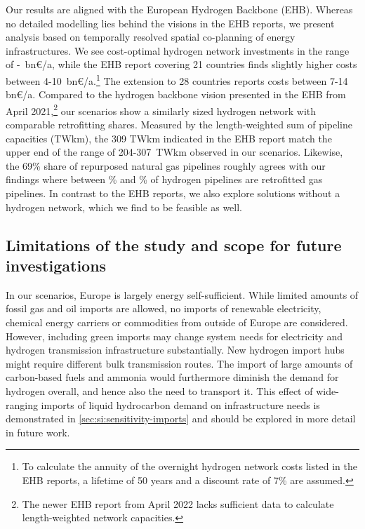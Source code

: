 Our results are aligned with the European Hydrogen Backbone
(EHB).\cite{gasforclimateEuropeanHydrogen2020,gasforclimateExtendingEuropean2021,gasforclimateEuropeanHydrogen2021,gasforclimateEuropeanHydrogen2022}
Whereas no detailed modelling lies behind the visions in the EHB reports, we
present analysis based on temporally resolved spatial co-planning of energy
infrastructures. We see cost-optimal hydrogen network investments in the range
of \minhycost-\maxhycost~bn\euro/a, while the EHB report covering 21 countries
finds slightly higher costs between
4-10~bn\euro/a.\cite{gasforclimateExtendingEuropean2021}\footnote{To calculate
the annuity of the overnight hydrogen network costs listed in the EHB reports, a
lifetime of 50 years and a discount rate of 7\% are assumed.} The extension to
28 countries reports costs between 7-14
bn\euro/a.\cite{gasforclimateEuropeanHydrogen2022} Compared to the hydrogen
backbone vision presented in the EHB from April
2021,\cite{gasforclimateExtendingEuropean2021}\footnote{The newer EHB report
from April 2022 \cite{gasforclimateEuropeanHydrogen2022} lacks sufficient data
to calculate length-weighted network capacities.} our scenarios show a
similarly sized hydrogen network with comparable retrofitting shares. Measured
by the length-weighted sum of pipeline capacities (TWkm), the 309 TWkm indicated
in the EHB report match the upper end of the range of 204-307~TWkm observed in
our scenarios. Likewise, the 69\% share of repurposed natural gas pipelines
\cite{gasforclimateExtendingEuropean2021} roughly agrees with our findings where
between \minretroshare\% and \maxretroshare\% of hydrogen pipelines are
retrofitted gas pipelines. In contrast to the EHB reports, we also explore
solutions without a hydrogen network, which we find to be feasible as well.

\subsection*{Limitations of the study and scope for future investigations}
\label{sec:limitations}

In our scenarios, Europe is largely energy self-sufficient. While limited
amounts of fossil gas and oil imports are allowed, no imports of renewable
electricity, chemical energy carriers or commodities from outside of Europe are
considered. However, including green imports may change system needs for
electricity and hydrogen transmission infrastructure substantially. New hydrogen
import hubs might require different bulk transmission routes. The import of
large amounts of carbon-based fuels and ammonia would furthermore diminish the
demand for hydrogen overall, and hence also the need to transport it. This
effect of wide-ranging imports of liquid hydrocarbon demand on infrastructure
needs is demonstrated in \cref{sec:si:sensitivity-imports} and should be
explored in more detail in future work.
\cite{fasihiTechnoeconomicAssessment2019,heuserTechnoeconomicAnalysis2019,hamppImportOptions2023}

